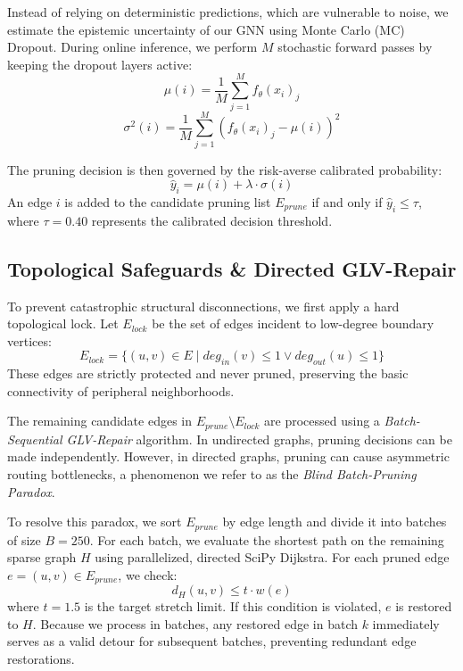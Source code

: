 \documentclass[journal]{IEEEtran}
\begin{document}
Instead of relying on deterministic predictions, which are vulnerable to noise, we estimate the epistemic uncertainty of our GNN using Monte Carlo (MC) Dropout. During online inference, we perform $M$ stochastic forward passes by keeping the dropout layers active:
\begin{equation}
    \mu(i) = \frac{1}{M} \sum_{j=1}^{M} f_\theta(x_i)_j
\end{equation}
\begin{equation}
    \sigma^2(i) = \frac{1}{M} \sum_{j=1}^{M} \left( f_\theta(x_i)_j - \mu(i) \right)^2
\end{equation}

The pruning decision is then governed by the risk-averse calibrated probability:
\begin{equation}
    \hat{y}_i = \mu(i) + \lambda \cdot \sigma(i)
\end{equation}
An edge $i$ is added to the candidate pruning list $E_{prune}$ if and only if $\hat{y}_i \le \tau$, where $\tau = 0.40$ represents the calibrated decision threshold.

\subsection{Topological Safeguards \& Directed GLV-Repair}
To prevent catastrophic structural disconnections, we first apply a hard topological lock. Let $E_{lock}$ be the set of edges incident to low-degree boundary vertices:
\begin{equation}
    E_{lock} = \{ (u, v) \in E \mid deg_{in}(v) \le 1 \lor deg_{out}(u) \le 1 \}
\end{equation}
These edges are strictly protected and never pruned, preserving the basic connectivity of peripheral neighborhoods.

The remaining candidate edges in $E_{prune} \setminus E_{lock}$ are processed using a \textit{Batch-Sequential GLV-Repair} algorithm. In undirected graphs, pruning decisions can be made independently. However, in directed graphs, pruning can cause asymmetric routing bottlenecks, a phenomenon we refer to as the \textit{Blind Batch-Pruning Paradox}.

To resolve this paradox, we sort $E_{prune}$ by edge length and divide it into batches of size $B = 250$. For each batch, we evaluate the shortest path on the remaining sparse graph $H$ using parallelized, directed SciPy Dijkstra. For each pruned edge $e = (u, v) \in E_{prune}$, we check:
\begin{equation}
    d_H(u, v) \le t \cdot w(e)
\end{equation}
where $t = 1.5$ is the target stretch limit. If this condition is violated, $e$ is restored to $H$. Because we process in batches, any restored edge in batch $k$ immediately serves as a valid detour for subsequent batches, preventing redundant edge restorations.
\end{document}
